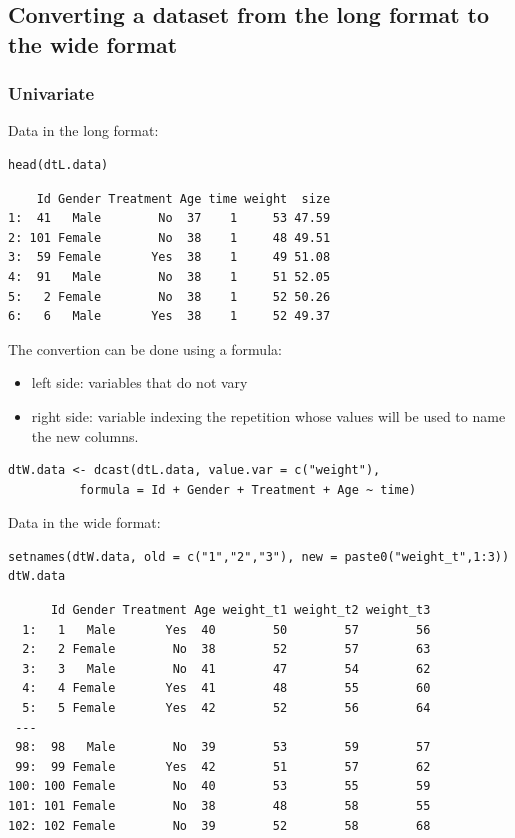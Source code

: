 \documentclass{article}
\begin{document}
\subsection{Converting a dataset from the long format to the wide format}
\label{sec:orgc2d89e4}

\subsubsection{Univariate}
\label{sec:orgdef9e2b}
Data in the long format:
\lstset{language=r,label= ,caption= ,captionpos=b,numbers=none}
\begin{lstlisting}
head(dtL.data)
\end{lstlisting}

\begin{verbatim}
    Id Gender Treatment Age time weight  size
1:  41   Male        No  37    1     53 47.59
2: 101 Female        No  38    1     48 49.51
3:  59 Female       Yes  38    1     49 51.08
4:  91   Male        No  38    1     51 52.05
5:   2 Female        No  38    1     52 50.26
6:   6   Male       Yes  38    1     52 49.37
\end{verbatim}

The convertion can be done using a formula:
\begin{itemize}
\item left side: variables that do not vary
\item right side: variable indexing the repetition whose values will be
used to name the new columns.
\end{itemize}
\lstset{language=r,label= ,caption= ,captionpos=b,numbers=none}
\begin{lstlisting}
dtW.data <- dcast(dtL.data, value.var = c("weight"),
		  formula = Id + Gender + Treatment + Age ~ time)
\end{lstlisting}

Data in the wide format:
\lstset{language=r,label= ,caption= ,captionpos=b,numbers=none}
\begin{lstlisting}
setnames(dtW.data, old = c("1","2","3"), new = paste0("weight_t",1:3))
dtW.data
\end{lstlisting}

\begin{verbatim}
      Id Gender Treatment Age weight_t1 weight_t2 weight_t3
  1:   1   Male       Yes  40        50        57        56
  2:   2 Female        No  38        52        57        63
  3:   3   Male        No  41        47        54        62
  4:   4 Female       Yes  41        48        55        60
  5:   5 Female       Yes  42        52        56        64
 ---                                                       
 98:  98   Male        No  39        53        59        57
 99:  99 Female       Yes  42        51        57        62
100: 100 Female        No  40        53        55        59
101: 101 Female        No  38        48        58        55
102: 102 Female        No  39        52        58        68
\end{verbatim}
\end{document}
